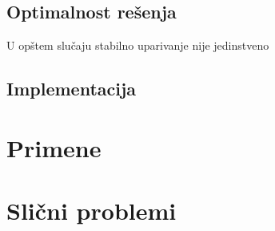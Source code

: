 \documentclass[a4paper]{article}
\begin{document}
\subsection{Optimalnost rešenja}
U opštem slučaju stabilno uparivanje nije jedinstveno

\subsection{Implementacija}

\section{Primene}

\section{Slični problemi}

\appendix
 

\end{document}
